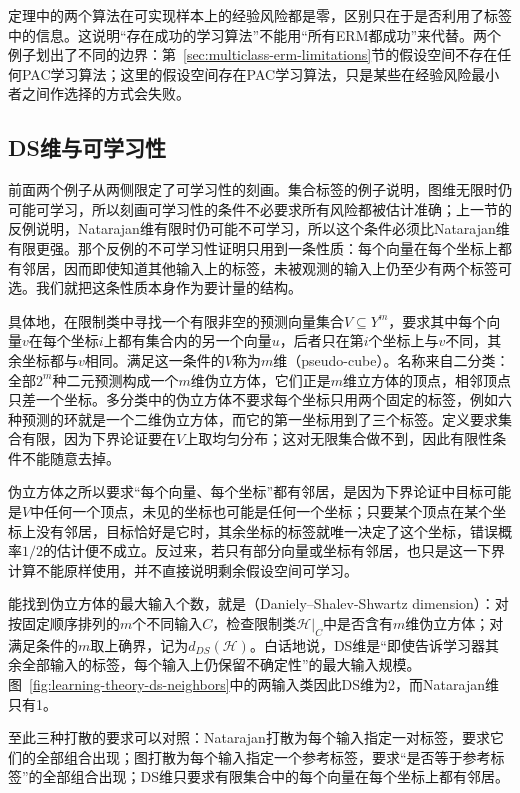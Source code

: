 定理中的两个算法在可实现样本上的经验风险都是零，区别只在于是否利用了标签中的信息。这说明“存在成功的学习算法”不能用“所有ERM都成功”来代替。两个例子划出了不同的边界：第~\ref{sec:multiclass-erm-limitations}节的假设空间不存在任何PAC学习算法；这里的假设空间存在PAC学习算法，只是某些在经验风险最小者之间作选择的方式会失败。

\subsection{DS维与可学习性}
\label{sec:ds-dimension}

前面两个例子从两侧限定了可学习性的刻画。集合标签的例子说明，图维无限时仍可能可学习，所以刻画可学习性的条件不必要求所有风险都被估计准确；上一节的反例说明，Natarajan维有限时仍可能不可学习，所以这个条件必须比Natarajan维有限更强。那个反例的不可学习性证明只用到一条性质：每个向量在每个坐标上都有邻居，因而即使知道其他输入上的标签，未被观测的输入上仍至少有两个标签可选。我们就把这条性质本身作为要计量的结构。

具体地，在限制类中寻找一个有限非空的预测向量集合$V\subseteq Y^m$，要求其中每个向量$v$在每个坐标$i$上都有集合内的另一个向量$u$，后者只在第$i$个坐标上与$v$不同，其余坐标都与$v$相同。满足这一条件的$V$称为$m$维（pseudo-cube）。名称来自二分类：全部$2^m$种二元预测构成一个$m$维伪立方体，它们正是$m$维立方体的顶点，相邻顶点只差一个坐标。多分类中的伪立方体不要求每个坐标只用两个固定的标签，例如六种预测的环就是一个二维伪立方体，而它的第一坐标用到了三个标签。定义要求集合有限，因为下界论证要在$V$上取均匀分布；这对无限集合做不到，因此有限性条件不能随意去掉。

伪立方体之所以要求“每个向量、每个坐标”都有邻居，是因为下界论证中目标可能是$V$中任何一个顶点，未见的坐标也可能是任何一个坐标；只要某个顶点在某个坐标上没有邻居，目标恰好是它时，其余坐标的标签就唯一决定了这个坐标，错误概率$1/2$的估计便不成立。反过来，若只有部分向量或坐标有邻居，也只是这一下界计算不能原样使用，并不直接说明剩余假设空间可学习。

能找到伪立方体的最大输入个数，就是（Daniely--Shalev-Shwartz dimension）：对按固定顺序排列的$m$个不同输入$C$，检查限制类$\mathcal H|_C$中是否含有$m$维伪立方体；对满足条件的$m$取上确界，记为$d_{DS}(\mathcal H)$。白话地说，DS维是“即使告诉学习器其余全部输入的标签，每个输入上仍保留不确定性”的最大输入规模。图~\ref{fig:learning-theory-ds-neighbors}中的两输入类因此DS维为2，而Natarajan维只有1。

至此三种打散的要求可以对照：Natarajan打散为每个输入指定一对标签，要求它们的全部组合出现；图打散为每个输入指定一个参考标签，要求“是否等于参考标签”的全部组合出现；DS维只要求有限集合中的每个向量在每个坐标上都有邻居。

